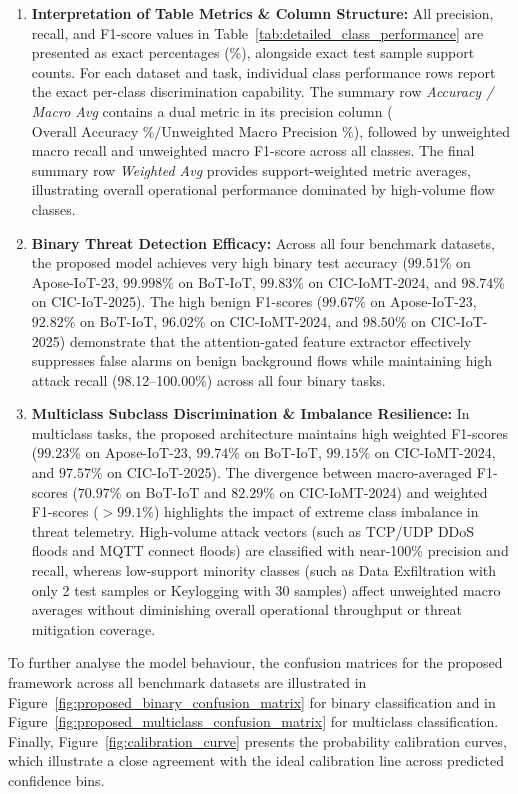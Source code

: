 \documentclass[a4paper,fleqn]{cas-sc}
\begin{document}
\begin{enumerate}
    \item \textbf{Interpretation of Table Metrics \& Column Structure:}
    All precision, recall, and F1-score values in Table~\ref{tab:detailed_class_performance} are presented as exact percentages (\%), alongside exact test sample support counts. For each dataset and task, individual class performance rows report the exact per-class discrimination capability. The summary row \textit{Accuracy / Macro Avg} contains a dual metric in its precision column ($\text{Overall Accuracy \%} / \text{Unweighted Macro Precision \%}$), followed by unweighted macro recall and unweighted macro F1-score across all classes. The final summary row \textit{Weighted Avg} provides support-weighted metric averages, illustrating overall operational performance dominated by high-volume flow classes.

    \item \textbf{Binary Threat Detection Efficacy:}
    Across all four benchmark datasets, the proposed model achieves very high binary test accuracy ($99.51\%$ on Apose-IoT-23, $99.998\%$ on BoT-IoT, $99.83\%$ on CIC-IoMT-2024, and $98.74\%$ on CIC-IoT-2025). The high benign F1-scores ($99.67\%$ on Apose-IoT-23, $92.82\%$ on BoT-IoT, $96.02\%$ on CIC-IoMT-2024, and $98.50\%$ on CIC-IoT-2025) demonstrate that the attention-gated feature extractor effectively suppresses false alarms on benign background flows while maintaining high attack recall (98.12--100.00\%) across all four binary tasks.

    \item \textbf{Multiclass Subclass Discrimination \& Imbalance Resilience:}
    In multiclass tasks, the proposed architecture maintains high weighted F1-scores ($99.23\%$ on Apose-IoT-23, $99.74\%$ on BoT-IoT, $99.15\%$ on CIC-IoMT-2024, and $97.57\%$ on CIC-IoT-2025). The divergence between macro-averaged F1-scores ($70.97\%$ on BoT-IoT and $82.29\%$ on CIC-IoMT-2024) and weighted F1-scores ($>99.1\%$) highlights the impact of extreme class imbalance in threat telemetry. High-volume attack vectors (such as TCP/UDP DDoS floods and MQTT connect floods) are classified with near-100\% precision and recall, whereas low-support minority classes (such as Data Exfiltration with only 2 test samples or Keylogging with 30 samples) affect unweighted macro averages without diminishing overall operational throughput or threat mitigation coverage.
\end{enumerate}

To further analyse the model behaviour, the confusion matrices for the proposed framework across all benchmark datasets are illustrated in Figure~\ref{fig:proposed_binary_confusion_matrix} for binary classification and in Figure~\ref{fig:proposed_multiclass_confusion_matrix} for multiclass classification. Finally, Figure~\ref{fig:calibration_curve} presents the probability calibration curves, which illustrate a close agreement with the ideal calibration line across predicted confidence bins.
\end{document}
